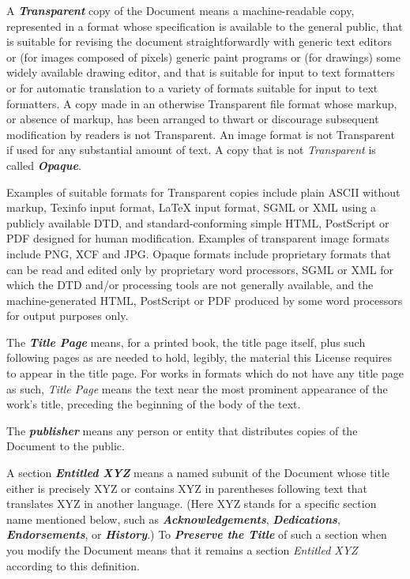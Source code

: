 A \emph{\textbf{Transparent}} copy of the Document means a
machine-readable copy, represented in a format whose specification is
available to the general public, that is suitable for revising the
document straightforwardly with generic text editors or (for images
composed of pixels) generic paint programs or (for drawings) some
widely available drawing editor, and that is suitable for input to
text formatters or for automatic translation to a variety of formats
suitable for input to text formatters.  A copy made in an otherwise
Transparent file format whose markup, or absence of markup, has been
arranged to thwart or discourage subsequent modification by readers is
not Transparent.  An image format is not Transparent if used for any
substantial amount of text.  A copy that is not \emph{Transparent} is
called \emph{\textbf{Opaque}}.

Examples of suitable formats for Transparent copies include plain
ASCII without markup, Texinfo input format, LaTeX input format, SGML
or XML using a publicly available DTD, and standard-conforming simple
HTML, PostScript or PDF designed for human modification.  Examples of
transparent image formats include PNG, XCF and JPG.  Opaque formats
include proprietary formats that can be read and edited only by
proprietary word processors, SGML or XML for which the DTD and/or
processing tools are not generally available, and the
machine-generated HTML, PostScript or PDF produced by some word
processors for output purposes only.

The \emph{\textbf{Title Page}} means, for a printed book, the title
page itself, plus such following pages as are needed to hold, legibly,
the material this License requires to appear in the title page.  For
works in formats which do not have any title page as such, \emph{Title
  Page} means the text near the most prominent appearance of the
work's title, preceding the beginning of the body of the text.

The \emph{\textbf{publisher}} means any person or entity that
distributes copies of the Document to the public.

A section \emph{\textbf{Entitled XYZ}} means a named subunit of the
Document whose title either is precisely XYZ or contains XYZ in
parentheses following text that translates XYZ in another language.
(Here XYZ stands for a specific section name mentioned below, such as
\emph{\textbf{Acknowledgements}}, \emph{\textbf{Dedications}},
\emph{\textbf{Endorsements}}, or \emph{\textbf{History}}.)  To
\emph{\textbf{Preserve the Title}} of such a section when you modify
the Document means that it remains a section \emph{Entitled XYZ}
according to this definition.

